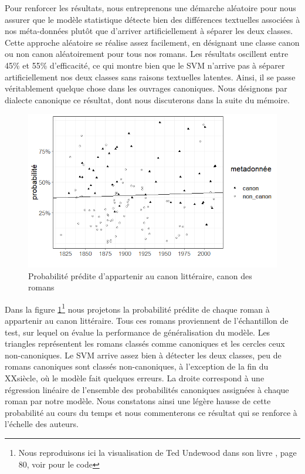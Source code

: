 Pour renforcer les résultats, nous entreprenons une démarche aléatoire pour nous assurer que le modèle statistique détecte bien des différences textuelles associées à nos méta-données plutôt que d'arriver artificiellement à séparer les deux classes. Cette approche aléatoire se réalise assez facilement, en désignant une classe canon ou non canon aléatoirement pour tous nos romans. Les résultats oscillent entre 45\% et 55\% d'efficacité, ce qui montre bien que le SVM n'arrive pas à séparer artificiellement nos deux classes sans raisons textuelles latentes. Ainsi, il se passe véritablement quelque chose dans les ouvrages canoniques. Nous désignons par dialecte canonique ce résultat, dont nous discuterons dans la suite du mémoire. 

\bigskip
\begin{figure}[!ht]
    \centering
    \includegraphics[width=15cm]{img/08_main_vis_svm.png}
    \caption{Probabilité prédite d'appartenir au canon littéraire, canon des romans}
    \label{svm_novel}
\end{figure}

Dans la figure \ref{svm_novel}\footnote{Nous reproduisons ici la visualisation de Ted Undewood dans son livre \cite{underwood_distant_2019}, page 80, voir \cite{underwood_tedunderwoodhorizon_2018} pour le code} nous projetons la probabilité prédite de chaque roman à appartenir au canon littéraire. Tous ces romans proviennent de l'échantillon de test, sur lequel on évalue la performance de généralisation du modèle. Les triangles représentent les romans classés comme canoniques et les cercles ceux non-canoniques. Le SVM arrive assez bien à détecter les deux classes, peu de romans canoniques sont classés non-canoniques, à l'exception de la fin du XX\ieme siècle, où le modèle fait quelques erreurs. La droite correspond à une régression linéaire de l'ensemble des probabilités canoniques assignées à chaque roman par notre modèle. Nous constatons ainsi une légère hausse de cette probabilité au cours du temps et nous commenterons ce résultat qui se renforce à l'échelle des auteurs.


